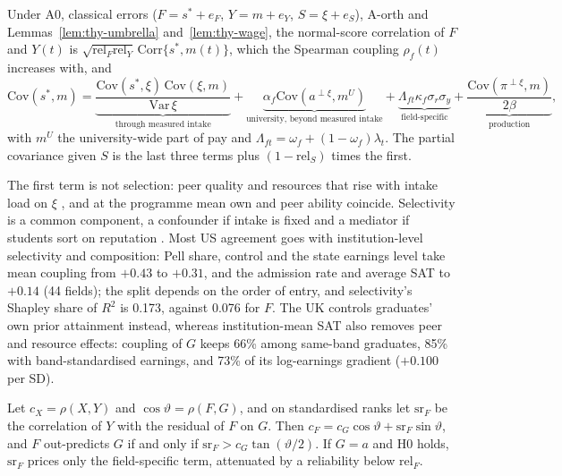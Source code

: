 \begin{thyprop}\label{prop:thy-agree}
Under A0, classical errors ($F=s^*+e_F$, $Y=m+e_Y$, $S=\xi+e_S$), A-orth and Lemmas~\ref{lem:thy-umbrella}
and~\ref{lem:thy-wage}, the normal-score correlation of $F$ and $Y(t)$ is
$\sqrt{\mathrm{rel}_F\mathrm{rel}_Y}\,\mathrm{Corr}\{s^*,m(t)\}$, which the Spearman coupling $\rho_f(t)$ increases
with, and
\begin{equation}\label{eq:thy-decomp}
\mathrm{Cov}(s^*,m)=\underbrace{\frac{\mathrm{Cov}(s^*,\xi)\,\mathrm{Cov}(\xi,m)}{\mathrm{Var}\,\xi}}_{\text{through measured intake}}
+\underbrace{\alpha_f\mathrm{Cov}(a^{\perp\xi},m^U)}_{\text{university, beyond measured intake}}
+\underbrace{\Lambda_{ft}\kappa_f\sigma_r\sigma_y}_{\text{field-specific}}
+\underbrace{\frac{\mathrm{Cov}(\pi^{\perp\xi},m)}{2\beta}}_{\text{production}},
\end{equation}
with $m^U$ the university-wide part of pay and $\Lambda_{ft}=\omega_f+(1-\omega_f)\lambda_t$. The partial covariance
given $S$ is the last three terms plus $(1-\mathrm{rel}_S)$ times the first.
\end{thyprop}

The first term is not selection: peer quality and resources that rise with intake load on $\xi$
\citep{dale2002estimating}, and at the programme mean own and peer ability coincide. Selectivity is a common
component, a confounder if intake is fixed and a mediator if students sort on reputation
\citep{macleod2015reputation}. Most US agreement goes with institution-level
selectivity and composition: Pell share, control and the state earnings level take mean coupling from $+0.43$ to
$+0.31$, and the admission rate and average SAT to $+0.14$ (44 fields); the split depends on the order of entry, and
selectivity's Shapley share of $R^2$ is 0.173, against 0.076 for $F$. The UK controls graduates' own
prior attainment instead, whereas institution-mean SAT also removes peer and resource effects: coupling of $G$ keeps
66\%  among same-band graduates, 85\%  with band-standardised earnings, and 73\% 
of its log-earnings gradient ($+0.100$ per SD).

\begin{thyprop}\label{prop:thy-level}
Let $c_X=\rho(X,Y)$ and $\cos\vartheta=\rho(F,G)$, and on standardised ranks let $\mathrm{sr}_F$ be the
correlation of $Y$ with the residual of $F$ on $G$. Then $c_F=c_G\cos\vartheta+\mathrm{sr}_F\sin\vartheta$, and $F$ out-predicts $G$ if
and only if $\mathrm{sr}_F>c_G\tan(\vartheta/2)$. If $G=a$ and H0 holds, $\mathrm{sr}_F$ prices only the
field-specific term, attenuated by a reliability below $\mathrm{rel}_F$.
\end{thyprop}

